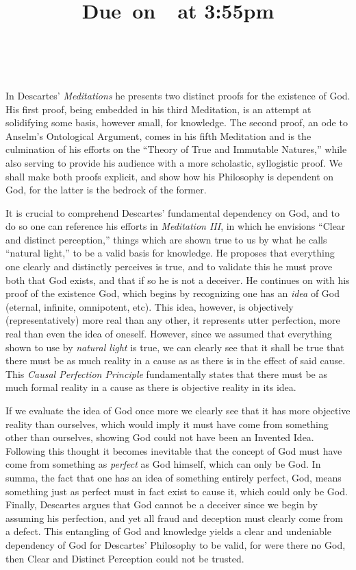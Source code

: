 \documentclass{article}
\title{
        \vspace{2in}
        \textmd{{\hmwkClass}}\\
        \textbf{\hmwkTitle}\\
        \normalsize\vspace{0.1in}\small{Due\ on\ \hmwkDueDate\ at 3:55pm}\\
        \vspace{0.1in}\large{\textit{\hmwkClassInstructor\ \hmwkClassTime}}
        \vspace{3in}
    }
\author{\hmwkAuthorName}
\date{}
\begin{document}
\maketitle
\pagebreak
In Descartes' \textit{Meditations} he presents two distinct proofs for the 
existence of God. His first proof, being embedded in his third Meditation, is 
an attempt at solidifying some basis, however small, for knowledge. The second 
proof, an ode to Anselm's Ontological Argument, comes in his fifth Meditation 
and is the culmination of his efforts on the ``Theory of True and Immutable 
Natures,'' while also serving to provide his audience with a more scholastic, syllogistic proof. We shall make both proofs explicit, and show how his Philosophy is dependent on God, for the latter is the bedrock of the former.

It is crucial to comprehend Descartes' fundamental dependency on God, and to do 
so one can reference his efforts in \textit{Meditation III}, in which he envisions 
``Clear and distinct perception,'' things which are shown true to us by what he 
calls ``natural light,'' to be a valid basis for knowledge. He proposes that 
everything one clearly and distinctly perceives is true, and to validate this 
he must prove both that God exists, and that if so he is not a deceiver. He continues on with 
his proof of the existence God, which begins by recognizing one has an \emph
{idea} of God (eternal, infinite, omnipotent, etc). This idea, however, is 
objectively (representatively) more real than any other, it represents utter perfection,
 more real than even the idea of oneself. However, since we assumed that 
everything shown to use by \emph{natural light} is true, we can clearly see 
that it shall be true that there must be as much reality in a cause as as there 
is in the effect of said cause. This \emph{Causal Perfection Principle} 
fundamentally states that there must be as much formal reality in a cause as 
there is objective reality in its idea.

If we evaluate the idea of God once more we clearly see that it has more 
objective reality than ourselves, which would imply it must have come from 
something other than ourselves, showing God could not have been an Invented 
Idea. Following this thought it becomes inevitable that the concept of God must 
have come from something as \emph{perfect} as God himself, which can only be 
God. In summa, the fact that one has an idea of something entirely perfect, God,
means something just as perfect must in fact exist to cause it, which could 
only be God. Finally, Descartes argues that God cannot be a deceiver since we 
begin by assuming his perfection, and yet all fraud and deception must clearly 
come from a defect. This entangling of God and knowledge yields a clear and 
undeniable dependency of God for Descartes' Philosophy to be valid, for were 
there no God, then Clear and Distinct Perception could not be trusted.
\end{document}
